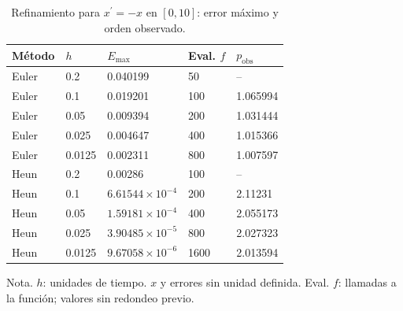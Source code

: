\begin{table}[H]\centering\small\setlength{\tabcolsep}{4pt}
\caption{Refinamiento para $x^{\prime}=-x$ en $[0,10]$: error máximo y orden observado.}\label{tab:convergencia}
\begin{tabular}{lllll}
\toprule
Método & $h$ & $E_{\max}$ & Eval. $f$ & $p_{\mathrm{obs}}$\\
\midrule
Euler & 0.2 & 0.040199 & 50 & --\\
Euler & 0.1 & 0.019201 & 100 & 1.065994\\
Euler & 0.05 & 0.009394 & 200 & 1.031444\\
Euler & 0.025 & 0.004647 & 400 & 1.015366\\
Euler & 0.0125 & 0.002311 & 800 & 1.007597\\
Heun & 0.2 & 0.00286 & 100 & --\\
Heun & 0.1 & $6.61544\times 10^{-4}$ & 200 & 2.11231\\
Heun & 0.05 & $1.59181\times 10^{-4}$ & 400 & 2.055173\\
Heun & 0.025 & $3.90485\times 10^{-5}$ & 800 & 2.027323\\
Heun & 0.0125 & $9.67058\times 10^{-6}$ & 1600 & 2.013594\\
\bottomrule\end{tabular}
\end{table}
{\footnotesize Nota. $h$: unidades de tiempo. $x$ y errores sin unidad definida. Eval. $f$: llamadas a la función; valores sin redondeo previo.}
